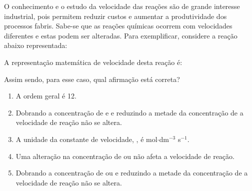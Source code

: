 O conhecimento e o estudo da velocidade das reações são de grande interesse industrial, pois permitem reduzir custos e aumentar a produtividade dos processos fabris. Sabe-se que as reações químicas ocorrem com velocidades diferentes e estas podem ser alteradas. Para exemplificar, considere a reação abaixo representada:

A representação matemática de velocidade desta reação é:

Assim sendo, para esse caso, qual afirmação está correta?

\begin{enumerate}[label = (\alph*)]
	\item A ordem geral é 12.
	\item Dobrando a concentração de  e  e reduzindo a metade da concentração de  a velocidade de reação não se altera.
	\item A unidade da constante de velocidade, , é mol$\cdot$dm$^{-3}$ s$^{-1}$.
	\item Uma alteração na concentração de  ou  não afeta a velocidade de reação.
	\item Dobrando a concentração de  ou  e reduzindo a metade da concentração de  a velocidade de reação não se altera.
\end{enumerate}
